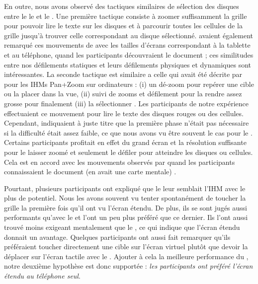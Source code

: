 En outre, nous avons observé des tactiques similaires de sélection des disques entre le le  et le . Une première tactique consiste à zoomer suffisamment la grille pour pouvoir lire le texte sur les disques et à parcourir toutes les cellules de la grille jusqu'à trouver celle correspondant au disque sélectionné. \cite{Raedle2014} avaient également remarqué ces mouvements de   avec les tailles d'écrans correspondant à la tablette et au téléphone, quand les participants découvraient le document ; ces similitudes entre nos défilements statiques et leurs défilements physiques et dynamiques sont intéressantes. La seconde tactique est similaire a celle qui avait été décrite par \cite{Guiard2004} pour les IHMs Pan+Zoom sur ordinateurs : (i) un dé-zoom pour repérer une cible ou la placer dans la vue, (ii) suivi de zooms et défilement pour la rendre assez grosse pour finalement (iii) la sélectionner . Les participants de notre expérience effectuaient ce mouvement pour lire le texte des disques rouges ou des cellules. Cependant, \cite{Guiard2004} indiquaient à juste titre que la première phase n'était pas nécessaire si la difficulté était assez faible, ce que nous avons vu être souvent le cas pour le . Certains participants profitait en effet du grand écran et la résolution suffisante pour le laisser zoomé et seulement le défiler pour atteindre les disques ou cellules. Cela est en accord avec les mouvements observés par \cite{Raedle2014} quand les participants connaissaient le document (en avait une carte mentale) .

Pourtant, plusieurs participants ont expliqué que le  leur semblait l'IHM avec le plus de potentiel. Nous les avons souvent vu tenter spontanément de toucher la grille la première fois qu'il ont vu l'écran étendu. De plus, ils se sont jugés aussi performants qu'avec le  et l'ont un peu plus préféré que ce dernier. Ils l'ont aussi trouvé moins exigeant mentalement que le , ce qui indique que l'écran étendu donnait un avantage. Quelques participants ont aussi fait remarquer qu'ils préféraient toucher directement une cible sur l'écran virtuel plutôt que devoir la déplacer sur l'écran tactile avec le . Ajouter à cela la meilleure performance du , notre deuxième hypothèse est donc supportée : \emph{les participants ont préféré l'écran étendu au téléphone seul}.

